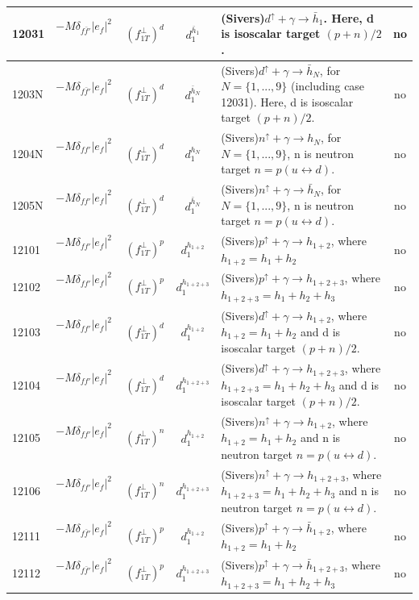 \documentclass[prd,nofootinbib,eqsecnum,final]{revtex4}
\renewcommand{\(}{\left(}
\renewcommand{\)}{\right)}
\renewcommand{\[}{\left[}
\renewcommand{\]}{\right]}
\begin{document}
\begin{center}
\begin{longtable}{||l|p{6cm}|c|c||p{7cm}|c||}
\\\hline \hline
12031 & $-M\delta_{f\bar f'}|e_f|^2$~~&$(f_{1T}^\perp)^{d}$ & $d^{\bar h_1}_1$ & (Sivers)$d^{\uparrow}+\gamma\to \bar h_1$. Here, d is isoscalar target $(p+n)/2$. & no
\\\hline
1203N & $-M\delta_{f\bar f'}|e_f|^2$~~&$(f_{1T}^\perp)^{d}$ & $d^{\bar h_N}_1$ & (Sivers)$d^{\uparrow}+\gamma\to \bar h_N$, for $N=\{1,...,9\}$ (including case 12031). Here, d is isoscalar target $(p+n)/2$. & no
\\\hline\hline
1204N & $-M\delta_{ff'}|e_f|^2$~~&$(f_{1T}^\perp)^d$ & $d^{h_N}_1$ & (Sivers)$n^{\uparrow}+\gamma\to h_N$, for $N=\{1,...,9\}$, n is neutron target $n=p(u\leftrightarrow d)$. & no
\\\hline
1205N & $-M\delta_{ff'}|e_f|^2$~~&$(f_{1T}^\perp)^d$ & $d^{\bar h_N}_1$ & (Sivers)$n^{\uparrow}+\gamma\to \bar h_N$, for $N=\{1,...,9\}$, n is neutron target $n=p(u\leftrightarrow d)$. & no
\\\hline \hline
12101 & $-M\delta_{ff'}|e_f|^2$~~&$(f_{1T}^\perp)^{p}$ & $d^{h_{1+2}}_1$ & (Sivers)$p^{\uparrow}+\gamma\to h_{1+2}$, where $h_{1+2}=h_1+h_2$ & no
\\\hline
12102 & $-M\delta_{ff'}|e_f|^2$~~&$(f_{1T}^\perp)^{p}$ & $d^{h_{1+2+3}}_1$ & (Sivers)$p^{\uparrow}+\gamma\to h_{1+2+3}$, where $h_{1+2+3}=h_1+h_2+h_3$ & no
\\\hline
12103 & $-M\delta_{ff'}|e_f|^2$~~&$(f_{1T}^\perp)^{d}$ & $d^{h_{1+2}}_1$ & (Sivers)$d^{\uparrow}+\gamma\to h_{1+2}$, where $h_{1+2}=h_1+h_2$ and d is isoscalar target $(p+n)/2$. & no
\\\hline
12104 & $-M\delta_{ff'}|e_f|^2$~~&$(f_{1T}^\perp)^{d}$ & $d^{h_{1+2+3}}_1$ & (Sivers)$d^{\uparrow}+\gamma\to h_{1+2+3}$, where $h_{1+2+3}=h_1+h_2+h_3$ and d is isoscalar target $(p+n)/2$. & no
\\\hline
12105 & $-M\delta_{ff'}|e_f|^2$~~&$(f_{1T}^\perp)^{n}$ & $d^{h_{1+2}}_1$ & (Sivers)$n^{\uparrow}+\gamma\to h_{1+2}$, where $h_{1+2}=h_1+h_2$ and n is neutron target $n=p(u\leftrightarrow d)$. & no
\\\hline
12106 & $-M\delta_{ff'}|e_f|^2$~~&$(f_{1T}^\perp)^{n}$ & $d^{h_{1+2+3}}_1$ & (Sivers)$n^{\uparrow}+\gamma\to h_{1+2+3}$, where $h_{1+2+3}=h_1+h_2+h_3$ and n is neutron target $n=p(u\leftrightarrow d)$. & no
\\\hline
12111 & $-M\delta_{f\bar f'}|e_f|^2$~~&$(f_{1T}^\perp)^{p}$ & $d^{h_{1+2}}_1$ & (Sivers)$p^{\uparrow}+\gamma\to \bar h_{1+2}$, where $h_{1+2}=h_1+h_2$ & no
\\\hline
12112 & $-M\delta_{f\bar f'}|e_f|^2$~~&$(f_{1T}^\perp)^{p}$ & $d^{h_{1+2+3}}_1$ & (Sivers)$p^{\uparrow}+\gamma\to \bar h_{1+2+3}$, where $h_{1+2+3}=h_1+h_2+h_3$ & no

\end{longtable}
\end{center}
\end{document}

